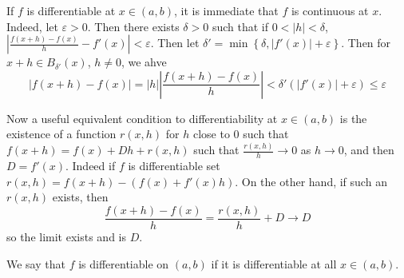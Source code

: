 If $f$ is differentiable at $x \in (a,b)$, it is immediate that $f$ is continuous at $x$. Indeed, let $\varepsilon > 0$. Then there exists $\delta > 0$ such that if $0 < |h| < \delta$, $\left|\frac{f(x+h)-f(x)}{h} - f'(x)\right| < \varepsilon$. Then let $\delta' = \min\left\{\delta, |f'(x)| + \varepsilon\right\}$. Then for $x+h \in B_{\delta'}(x)$, $h \neq 0$, we ahve \begin{equation*}
    |f(x+h) - f(x)| = |h|\left|\frac{f(x+h)-f(x)}{h}\right| < \delta'(|f'(x)| + \varepsilon) \leq \varepsilon
\end{equation*}

Now a useful equivalent condition to differentiability at $x \in (a,b)$ is the existence of a function $r(x,h)$ for $h$ close to $0$ such that $f(x+h) = f(x) + Dh + r(x,h)$ such that $\frac{r(x,h)}{h}\rightarrow 0$ as $h\rightarrow 0$, and then $D = f'(x)$. Indeed if $f$ is differentiable set $r(x,h) = f(x+h) - (f(x) + f'(x)h)$. On the other hand, if such an $r(x,h)$ exists, then $$\frac{f(x+h)-f(x)}{h} = \frac{r(x,h)}{h}+D\rightarrow D$$ so the limit exists and is $D$.

\begin{definition}
    We say that $f$ is differentiable on $(a,b)$ if it is differentiable at all $x \in (a,b)$.
\end{definition}

